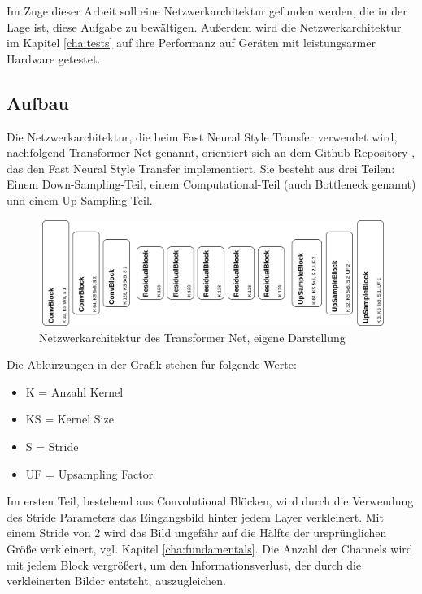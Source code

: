 Im Zuge dieser Arbeit soll eine Netzwerkarchitektur gefunden werden, die in der Lage ist, diese Aufgabe zu bewältigen. Außerdem wird die Netzwerkarchitektur im Kapitel \ref{cha:tests} auf ihre Performanz auf Geräten mit leistungsarmer Hardware getestet.

\subsection{Aufbau}
\label{sec:aufbau}

Die Netzwerkarchitektur, die beim Fast Neural Style Transfer verwendet wird, nachfolgend Transformer Net genannt, orientiert sich an dem Github-Repository \cite{PyTorchFastNeuralStyle}, das den Fast Neural Style Transfer implementiert.
Sie besteht aus drei Teilen: Einem Down-Sampling-Teil, einem Computational-Teil (auch Bottleneck genannt) und einem Up-Sampling-Teil.

\begin{figure}[H]
	\centering
	\includegraphics[width=1.0\textwidth]{resources/content/transformer_net.png}
	\caption{Netzwerkarchitektur des Transformer Net, eigene Darstellung}
	\label{img:transformer_net_img}
\end{figure}

Die Abkürzungen in der Grafik stehen für folgende Werte:

\begin{itemize}
	\item K = Anzahl Kernel
	\item KS = Kernel Size
	\item S = Stride
	\item UF = Upsampling Factor
\end{itemize}

Im ersten Teil, bestehend aus Convolutional Blöcken, wird durch die Verwendung des Stride Parameters das Eingangsbild hinter jedem Layer verkleinert. Mit einem Stride von 2 wird das Bild ungefähr auf die Hälfte der ursprünglichen Größe verkleinert, vgl. Kapitel \ref{cha:fundamentals}. Die Anzahl der Channels wird mit jedem Block vergrößert, um den Informationsverlust, der durch die verkleinerten Bilder entsteht, auszugleichen.

